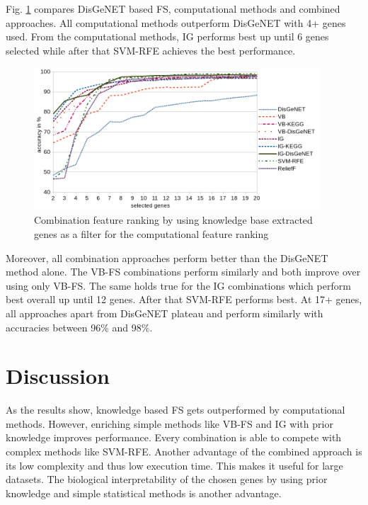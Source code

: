 
Fig. \ref{fig:accuracy} compares DisGeNET based FS, computational methods and combined approaches. 
All computational methods outperform DisGeNET with 4+ genes used. 
From the computational methods, IG performs best up until 6 genes selected while after that SVM-RFE achieves the best performance.

\begin{figure}[h!]
\setlength{\belowcaptionskip}{-15pt}
\centering
\includegraphics[width=0.95\textwidth]{figures/accuracy5.png}
\caption{Combination feature ranking by using knowledge base extracted genes as a filter for the computational feature ranking}
\label{fig:accuracy}
\end{figure}

Moreover, all combination approaches perform better than the DisGeNET method alone. 
The VB-FS combinations perform similarly and both improve over using only VB-FS. 
The same holds true for the IG combinations which perform best overall up until 12 genes.
After that SVM-RFE performs best.
At 17+ genes, all approaches apart from DisGeNET plateau and perform similarly with accuracies between 96\% and 98\%. 

\section{Discussion}
\label{sec:discussion}

As the results show, knowledge based FS gets outperformed by computational methods. 
However, enriching simple methods like VB-FS and IG with prior knowledge improves performance.
Every combination is able to compete with complex methods like SVM-RFE.  
Another advantage of the combined approach is its low complexity and thus low execution time.
This makes it useful for large datasets.
The biological interpretability of the chosen genes by using prior knowledge and simple statistical methods is another advantage.

